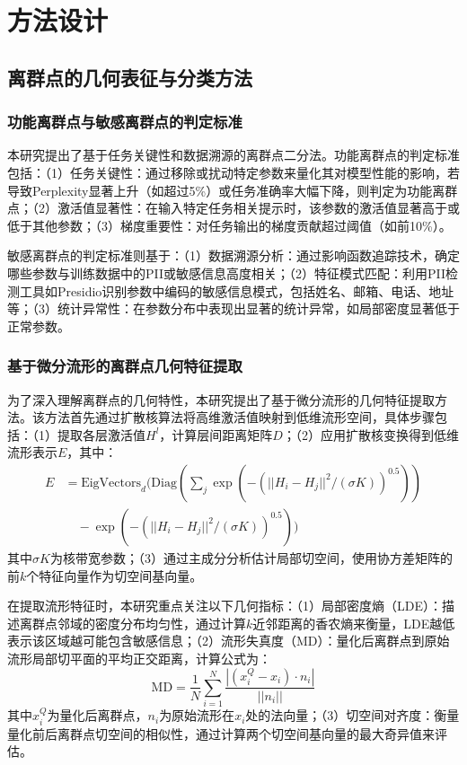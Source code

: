 \section{方法设计}

\subsection{离群点的几何表征与分类方法}

\subsubsection{功能离群点与敏感离群点的判定标准}

本研究提出了基于任务关键性和数据溯源的离群点二分法。功能离群点的判定标准包括：（1）任务关键性：通过移除或扰动特定参数来量化其对模型性能的影响，若导致Perplexity显著上升（如超过5\%）或任务准确率大幅下降，则判定为功能离群点；（2）激活值显著性：在输入特定任务相关提示时，该参数的激活值显著高于或低于其他参数；（3）梯度重要性：对任务输出的梯度贡献超过阈值（如前10\%）。

敏感离群点的判定标准则基于：（1）数据溯源分析：通过影响函数追踪技术，确定哪些参数与训练数据中的PII或敏感信息高度相关；（2）特征模式匹配：利用PII检测工具如Presidio识别参数中编码的敏感信息模式，包括姓名、邮箱、电话、地址等；（3）统计异常性：在参数分布中表现出显著的统计异常，如局部密度显著低于正常参数。

\subsubsection{基于微分流形的离群点几何特征提取}

为了深入理解离群点的几何特性，本研究提出了基于微分流形的几何特征提取方法。该方法首先通过扩散核算法将高维激活值映射到低维流形空间，具体步骤包括：（1）提取各层激活值$H^l$，计算层间距离矩阵$D$；（2）应用扩散核变换得到低维流形表示$E$，其中：
\begin{align}
E &= \text{EigVectors}_d(\text{Diag}(\sum_j \exp(-(||H_i-H_j||^2/(\sigma K))^{0.5})) \nonumber \\
&\quad - \exp(-(||H_i-H_j||^2/(\sigma K))^{0.5}))
\end{align}
其中$\sigma K$为核带宽参数；（3）通过主成分分析估计局部切空间，使用协方差矩阵的前$k$个特征向量作为切空间基向量。

在提取流形特征时，本研究重点关注以下几何指标：（1）局部密度熵（LDE）：描述离群点邻域的密度分布均匀性，通过计算$k$近邻距离的香农熵来衡量，LDE越低表示该区域越可能包含敏感信息；（2）流形失真度（MD）：量化后离群点到原始流形局部切平面的平均正交距离，计算公式为：
\begin{equation}
\text{MD} = \frac{1}{N}\sum_{i=1}^N \frac{|(x_i^Q - x_i) \cdot n_i|}{||n_i||}
\end{equation}
其中$x_i^Q$为量化后离群点，$n_i$为原始流形在$x_i$处的法向量；（3）切空间对齐度：衡量量化前后离群点切空间的相似性，通过计算两个切空间基向量的最大奇异值来评估。

